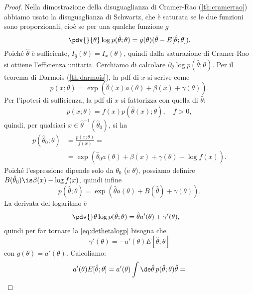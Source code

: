 \begin{proof}
	Nella dimostrazione della disuguaglianza di Cramer-Rao (\autoref{th:cramerrao})
	abbiamo usato la disuguaglianza di Schwartz,
	che è saturata se le due funzioni sono proporzionali,
	cioè se per una qualche funzione $g$
	\begin{equation}
		\label{eq:dethetalogp}
		\pdv{}{\theta}\log p(\hat\theta;\theta) = g(\theta) (\hat\theta-E[\hat\theta;\theta]).
	\end{equation}
	Poiché $\hat\theta$ è sufficiente, $I_{\hat\theta}(\theta)=I_x(\theta)$,
	quindi dalla saturazione di Cramer-Rao si ottiene l'efficienza unitaria.
	Cerchiamo di calcolare $\partial_\theta\log p(\hat\theta;\theta)$.
	Per il teorema di Darmois (\autoref{th:darmois}),
	la pdf di $x$ si scrive come
	\begin{equation*}
		p(x;\theta)
		= \exp \left( \hat\theta(x)a(\theta) + \beta(x) + \gamma(\theta) \right).
	\end{equation*}
	Per l'ipotesi di sufficienza, la pdf di $x$ si fattorizza con quella di $\hat\theta$:
	\begin{equation*}
		p(x;\theta)
		= f(x) p(\hat\theta(x);\theta), \quad f > 0,
	\end{equation*}
	quindi, per qualsiasi $x\in\hat\theta^{-1}(\hat\theta_0)$, si ha
	\begin{align*}
		p(\hat\theta_0;\theta)
		&= \frac{p(x;\theta)}{f(x)} = \\
		&= \exp \left( \hat\theta_0 a(\theta) + \beta(x) + \gamma(\theta) - \log f(x) \right).
	\end{align*}
	Poiché l'espressione dipende solo da $\theta_0$ (e $\theta$),
	possiamo definire $B(\hat\theta_0)\is\beta(x)-\log f(x)$,
	quindi infine
	\begin{equation*}
		p(\hat\theta;\theta)
		= \exp \left( \hat\theta a(\theta) + B(\hat\theta) + \gamma(\theta) \right).
	\end{equation*}
	La derivata del logaritmo è
	\begin{align*}
		\pdv{}\theta \log p(\hat\theta;\theta)
		&= \hat\theta a'(\theta) + \gamma'(\theta),
	\end{align*}
	quindi per far tornare la \eqref{eq:dethetalogp} bisogna che
	\begin{equation*}
		\gamma'(\theta) = -a'(\theta) E[\hat\theta;\theta]
	\end{equation*}
	con $g(\theta)=a'(\theta)$.
	Calcoliamo:
	\begin{align*}
		a'(\theta) E[\hat\theta;\theta]
		&= a'(\theta) \int\de\hat\theta\, p(\hat\theta;\theta) \hat\theta = \\

\end{align*}
\end{proof}
